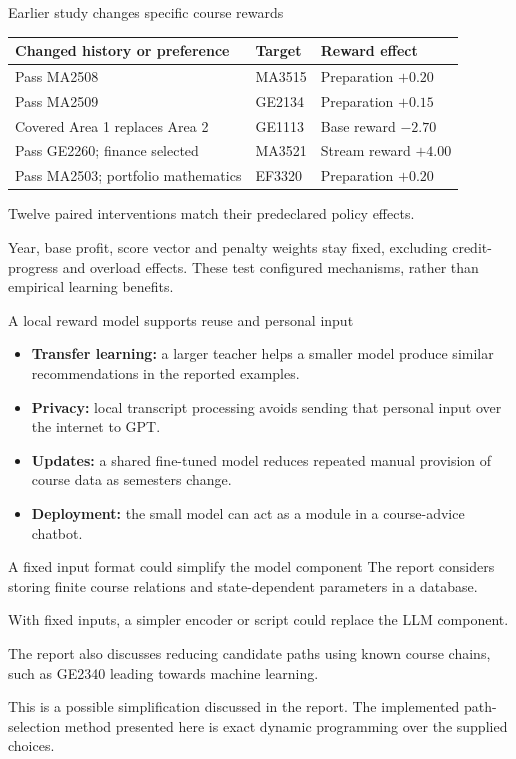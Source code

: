 \documentclass[aspectratio=169,11pt]{beamer}
\newcommand{\smallnote}[1]{\par{\footnotesize\color{muted}#1\par}}
\begin{document}
\begin{frame}{Earlier study changes specific course rewards}
\small
\begin{tabular}{L{6.3cm}L{2cm}L{3.5cm}}
\toprule
Changed history or preference & Target & Reward effect\\\midrule
Pass MA2508 & MA3515 & Preparation $+0.20$\\[6pt]
Pass MA2509 & GE2134 & Preparation $+0.15$\\[6pt]
Covered Area 1 replaces Area 2 & GE1113 & Base reward $-2.70$\\[6pt]
Pass GE2260; finance selected & MA3521 & Stream reward $+4.00$\\[6pt]
Pass MA2503; portfolio mathematics & EF3320 & Preparation $+0.20$\\
\bottomrule
\end{tabular}\par
\vspace{3mm}
\normalsize Twelve paired interventions match their predeclared policy effects.
\smallnote{Year, base profit, score vector and penalty weights stay fixed, excluding credit-progress and overload effects. These test configured mechanisms, rather than empirical learning benefits.}
\end{frame}

\begin{frame}{A local reward model supports reuse and personal input}
\begin{itemize}\setlength{\itemsep}{8pt}
\item \textbf{Transfer learning:} a larger teacher helps a smaller model produce similar recommendations in the reported examples.
\item \textbf{Privacy:} local transcript processing avoids sending that personal input over the internet to GPT.
\item \textbf{Updates:} a shared fine-tuned model reduces repeated manual provision of course data as semesters change.
\item \textbf{Deployment:} the small model can act as a module in a course-advice chatbot.
\end{itemize}
\end{frame}

\begin{frame}{A fixed input format could simplify the model component}
The report considers storing finite course relations and state-dependent parameters in a database.

With fixed inputs, a simpler encoder or script could replace the LLM component.

The report also discusses reducing candidate paths using known course chains, such as GE2340 leading towards machine learning.
\smallnote{This is a possible simplification discussed in the report. The implemented path-selection method presented here is exact dynamic programming over the supplied choices.}
\end{frame}
\end{document}
